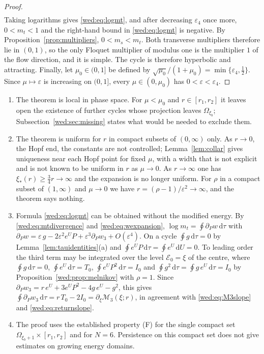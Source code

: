 \begin{proof}
\begin{gather*}
\end{gather*}
Taking logarithms gives \eqref{wed:eq:logmt}, and after decreasing $\varepsilon_4$ once more, $0<m_t<1$ and the right-hand bound in \eqref{wed:eq:logmt} is negative. By Proposition~\ref{prop:multipliers}, $0<m_s<m_t$. Both transverse multipliers therefore lie in $(0,1)$, so the only Floquet multiplier of modulus one is the multiplier $1$ of the flow direction, and it is simple. The cycle is therefore hyperbolic and attracting. Finally, let $\mu_0\in(0,1]$ be defined by $\sqrt{\mu_0}/(1+\mu_0)=\min\{\varepsilon_4,\tfrac12\}$. Since $\mu\mapsto\varepsilon$ is increasing on $(0,1]$, every $\mu\in(0,\mu_0)$ has $0<\varepsilon<\varepsilon_4$.
\end{proof}

\begin{remark}\label{wed:rem:scope}
\begin{enumerate}[label=\textup{(\alph*)}]
\item The theorem is local in phase space. For $\mu<\mu_0$ and $r\in[r_1,r_2]$ it leaves open the existence of further cycles whose projection leaves $\Omega_{\xi_b}$; Subsection~\ref{wed:sec:missing} states what would be needed to exclude them.
\item The theorem is uniform for $r$ in compact subsets of $(0,\infty)$ only. As $r\to0$, the Hopf end, the constants are not controlled; Lemma~\ref{lem:collar} gives uniqueness near each Hopf point for fixed $\mu$, with a width that is not explicit and is not known to be uniform in $r$ as $\mu\to0$. As $r\to\infty$ one has $\xi_*(r)\ge\tfrac34r\to\infty$ and the expansion is no longer uniform. For $\rho$ in a compact subset of $(1,\infty)$ and $\mu\to0$ we have $r=(\rho-1)/\varepsilon^2\to\infty$, and the theorem says nothing.
\item Formula \eqref{wed:eq:logmt} can be obtained without the modified energy. By \eqref{wed:eq:mtdivergence} and \eqref{wed:eq:wexpansion}, $\log m_t=\oint\partial_Pw\,\mathrm d\tau$ with $\partial_Pw=\varepsilon\,g-2\varepsilon^2e^UP+\varepsilon^3\partial_Pw_3+O(\varepsilon^4)$. On a cycle $\oint g\,\mathrm d\tau=0$ by Lemma~\ref{lem:tauidentities}(a) and $\oint e^UP\,\mathrm d\tau=\oint e^U\,\mathrm dU=0$. To leading order the third term may be integrated over the level $\mathcal E_0=\xi$ of the centre, where $\oint g\,\mathrm d\tau=0$, $\oint e^U\,\mathrm d\tau=T_0$, $\oint e^UP^2\,\mathrm d\tau=I_0$ and $\oint g^2\,\mathrm d\tau=\oint g\,e^U\,\mathrm d\tau=I_0$ by Proposition~\ref{wed:prop:melnikov} with $\rho=1$. Since $\partial_Pw_3=r\,e^U+3e^UP^2-4g\,e^U-g^2$, this gives $\oint\partial_Pw_3\,\mathrm d\tau=r\,T_0-2I_0=\partial_\xi\mathcal M_3(\xi;r)$, in agreement with \eqref{wed:eq:M3slope} and \eqref{wed:eq:returnslope}.
\item The proof uses the established property \textup{(F)} for the single compact set $\Omega_{\xi_b+1}\times[r_1,r_2]$ and for $N=6$. Persistence on this compact set does not give estimates on growing energy domains.
\end{enumerate}
\end{remark}

